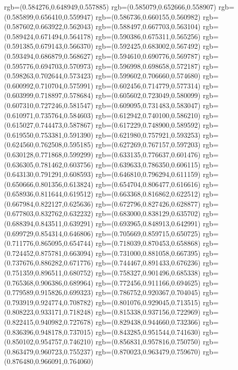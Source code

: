 {{{			rgb=(0.584276,0.648949,0.557885)
			rgb=(0.585079,0.652666,0.558907)
			rgb=(0.585899,0.656410,0.559947)
			rgb=(0.586736,0.660155,0.560982)
			rgb=(0.587602,0.663922,0.562043)
			rgb=(0.588497,0.667703,0.563104)
			rgb=(0.589424,0.671494,0.564178)
			rgb=(0.590386,0.675311,0.565256)
			rgb=(0.591385,0.679143,0.566370)
			rgb=(0.592425,0.683002,0.567492)
			rgb=(0.593494,0.686879,0.568627)
			rgb=(0.594610,0.690776,0.569787)
			rgb=(0.595776,0.694703,0.570973)
			rgb=(0.596998,0.698658,0.572187)
			rgb=(0.598263,0.702644,0.573423)
			rgb=(0.599602,0.706660,0.574680)
			rgb=(0.600992,0.710704,0.575991)
			rgb=(0.602456,0.714779,0.577314)
			rgb=(0.603999,0.718897,0.578684)
			rgb=(0.605602,0.723049,0.580099)
			rgb=(0.607310,0.727246,0.581547)
			rgb=(0.609095,0.731483,0.583047)
			rgb=(0.610971,0.735764,0.584603)
			rgb=(0.612942,0.740100,0.586210)
			rgb=(0.615027,0.744473,0.587867)
			rgb=(0.617229,0.748900,0.589592)
			rgb=(0.619550,0.753381,0.591390)
			rgb=(0.621980,0.757921,0.593253)
			rgb=(0.624560,0.762508,0.595185)
			rgb=(0.627269,0.767157,0.597203)
			rgb=(0.630128,0.771868,0.599299)
			rgb=(0.633135,0.776637,0.601476)
			rgb=(0.636305,0.781462,0.603756)
			rgb=(0.639633,0.786350,0.606115)
			rgb=(0.643130,0.791291,0.608593)
			rgb=(0.646810,0.796294,0.611159)
			rgb=(0.650666,0.801356,0.613824)
			rgb=(0.654704,0.806477,0.616616)
			rgb=(0.658936,0.811644,0.619512)
			rgb=(0.663368,0.816862,0.622512)
			rgb=(0.667984,0.822127,0.625636)
			rgb=(0.672796,0.827426,0.628877)
			rgb=(0.677803,0.832762,0.632232)
			rgb=(0.683000,0.838129,0.635702)
			rgb=(0.688394,0.843511,0.639291)
			rgb=(0.693965,0.848913,0.642991)
			rgb=(0.699729,0.854314,0.646806)
			rgb=(0.705669,0.859715,0.650725)
			rgb=(0.711776,0.865095,0.654744)
			rgb=(0.718039,0.870453,0.658868)
			rgb=(0.724452,0.875781,0.663094)
			rgb=(0.731000,0.881058,0.667395)
			rgb=(0.737676,0.886282,0.671776)
			rgb=(0.744467,0.891433,0.676236)
			rgb=(0.751359,0.896511,0.680752)
			rgb=(0.758327,0.901496,0.685338)
			rgb=(0.765368,0.906386,0.689964)
			rgb=(0.772456,0.911166,0.694625)
			rgb=(0.779589,0.915826,0.699323)
			rgb=(0.786752,0.920367,0.704045)
			rgb=(0.793919,0.924774,0.708782)
			rgb=(0.801076,0.929045,0.713515)
			rgb=(0.808223,0.933171,0.718248)
			rgb=(0.815338,0.937156,0.722969)
			rgb=(0.822415,0.940982,0.727678)
			rgb=(0.829438,0.944660,0.732366)
			rgb=(0.836396,0.948178,0.737015)
			rgb=(0.843285,0.951544,0.741630)
			rgb=(0.850102,0.954757,0.746210)
			rgb=(0.856831,0.957816,0.750750)
			rgb=(0.863479,0.960723,0.755237)
			rgb=(0.870023,0.963479,0.759670)
			rgb=(0.876480,0.966091,0.764060)
}}}
